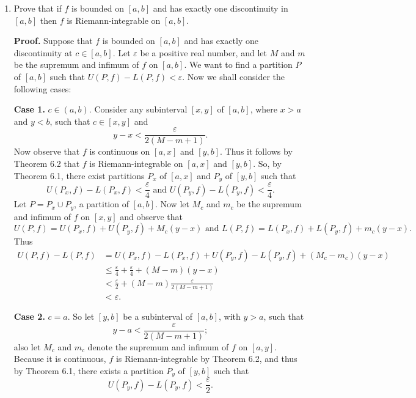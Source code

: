 \documentclass[9pt]{article}
\begin{document}
\begin{enumerate}
   \item Prove that if $f$ is bounded on $[a, b]$ and has exactly one
         discontinuity in $[a, b]$ then $f$ is Riemann-integrable on $[a, b]$.

      \textbf{Proof.} Suppose that $f$ is bounded on $[a, b]$ and has exactly
      one discontinuity at $c \in [a, b]$. Let $\varepsilon$ be a positive real
      number, and let $M$ and $m$ be the supremum and infimum of $f$ on
      $[a, b]$. We want to find a partition $P$ of $[a, b]$ such that
      $U(P, f) - L(P, f) < \varepsilon$. Now we shall consider the following
      cases:
      
      \textbf{Case 1.} $c \in (a, b)$. Consider any subinterval $[x, y]$ of
      $[a, b]$, where $x > a$ and $y < b$, such that $c \in [x, y]$ and
      $$y - x < \frac{\varepsilon}{2(M-m+1)}.$$
      Now
      observe that $f$ is continuous on $[a, x]$ and $[y, b]$. Thus it follows
      by Theorem 6.2 that $f$ is Riemann-integrable on $[a, x]$ and $[y, b]$.
      So, by Theorem 6.1, there exist partitions $P_x$ of $[a, x]$ and $P_y$ of
      $[y, b]$ such that
      $$U(P_x, f) - L(P_x, f) < \frac{\varepsilon}{4} \text{ and }
        U(P_y, f) - L(P_y, f) < \frac{\varepsilon}{4}.$$
      Let $P = P_x \cup P_y$, a partition of $[a, b]$. Now let $M_c$ and $m_c$
      be the supremum and infimum of $f$ on $[x, y]$ and observe that
      $$U(P, f) = U(P_x, f) + U(P_y, f) + M_c(y - x) \text{ and }
        L(P, f) = L(P_x, f) + L(P_y, f) + m_c(y - x).$$
      Thus
      \begin{align*}
         U(P, f) - L(P, f) &= U(P_x, f) - L(P_x, f) + U(P_y, f) - L(P_y, f) +
          (M_c - m_c)(y - x) \\
          &\le \frac{\varepsilon}{4} + \frac{\varepsilon}{4} + (M - m)(y - x) \\
          &<\frac{\varepsilon}{2} + (M - m)\frac{\varepsilon}{2(M-m+1)} \\
          &< \varepsilon.
      \end{align*}
      
      \textbf{Case 2.} $c = a$. So let $[y, b]$ be a subinterval of $[a, b]$,
      with $y > a$, such that
      $$y - a < \frac{\varepsilon}{2(M-m+1)};$$
      also let $M_c$ and $m_c$ denote the supremum and infimum of $f$ on
      $[a, y]$. Because it is continuous, $f$ is Riemann-integrable by Theorem
      6.2, and thus by Theorem 6.1, there exists a partition $P_y$ of $[y, b]$
      such that $$U(P_y, f) - L(P_y, f) < \frac{\varepsilon}{2}.$$
      

\end{enumerate}
\end{document}
